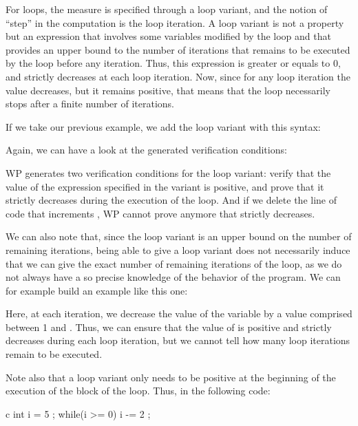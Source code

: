 For loops, the measure is specified through a loop variant, and the notion of
``step'' in the computation is the loop iteration. A loop variant is not a
property but an expression that involves some variables modified
by the loop and that provides an upper bound to the number of iterations that
remains to be executed by the loop before any iteration. Thus, this expression
is greater or equals to 0, and strictly decreases at each loop iteration. Now,
since for any loop iteration the value decreases, but it remains positive, that
means that the loop necessarily stops after a finite number of iterations.


If we take our previous example, we add the loop variant with this
syntax:




Again, we can have a look at the generated verification conditions:




WP generates two verification conditions for the loop variant: verify that the
value of the expression specified in the variant is positive, and prove that it
strictly decreases during the execution of the loop. And if we delete the line
of code that increments , WP cannot prove anymore that
 strictly decreases.


We can also note that, since the loop variant is an upper bound on the number of
remaining iterations, being able to give a loop variant does not necessarily
induce that we can give the exact number of remaining iterations of the loop, as
we do not always have a so precise knowledge of the behavior of the program. We
can for example build an example like this one:




Here, at each iteration, we decrease the value of the variable  by
a value comprised between 1 and . Thus, we can ensure that the
value of  is positive and strictly decreases during each loop
iteration, but we cannot tell how many loop iterations remain to be executed.


Note also that a loop variant only needs to be positive at the beginning
of the execution of the block of the loop. Thus, in the following code:


\begin{CodeBlock}{c}
int i = 5 ;
while(i >= 0){
  i -= 2 ;
}
\end{CodeBlock}


